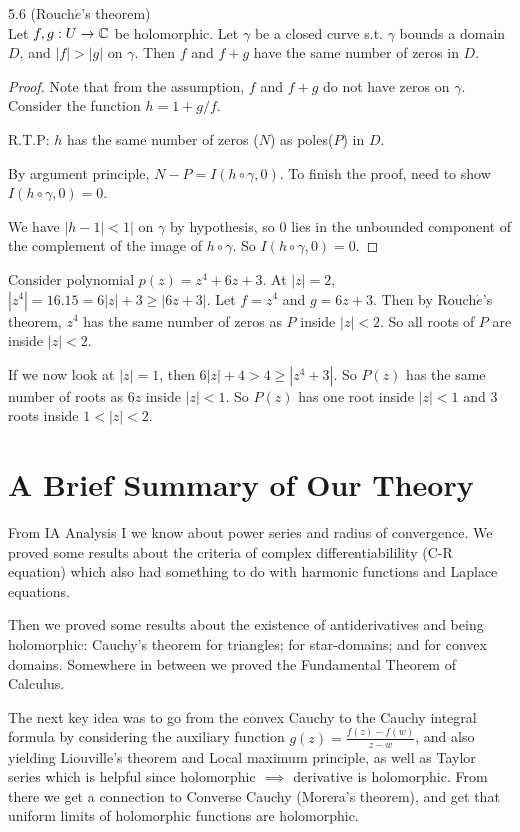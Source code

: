\documentclass[a4paper]{article}
\begin{document}
\begin{thm} 5.6 (Rouch$\acute{e}$'s theorem)\\
Let $f,g : U \to \mathbb{C}$ be holomorphic. Let $\gamma$ be a closed curve s.t. $\gamma$ bounds a domain $D$, and $|f| > |g|$ on $\gamma$. Then $f$ and $f+g$ have the same number of zeros in $D$.
\begin{proof}
Note that from the assumption, $f$ and $f+g$ do not have zeros on $\gamma$. Consider the function $h=1+g/f$.

R.T.P: $h$ has the same number of zeros ($N$) as poles($P$) in $D$.

By argument principle, $N-P = I(h\circ \gamma, 0)$. To finish the proof, need to show $I(h \circ \gamma,0) = 0$.

We have $|h-1|<1|$ on $\gamma$ by hypothesis, so $0$ lies in the unbounded component of the complement of the image of $h \circ \gamma$. So $I(h\circ \gamma,0) = 0$.
\end{proof}
\end{thm}

\begin{eg}
Consider polynomial $p(z) = z^4+6z+3$. At $|z|=2$, $|z^4|=16.15 = 6|z|+3 \geq |6z+3|$. Let $f=z^4$ and $g=6z+3$. Then by Rouch$\acute{e}$'s theorem, $z^4$ has the same number of zeros as $P$ inside $|z|<2$. So all roots of $P$ are inside $|z|<2$.

If we now look at $|z|=1$, then $6|z|+4 > 4 \geq |z^4+3|$. So $P(z)$ has the same number of roots as $6z$ inside $|z|<1$. So $P(z)$ has one root inside $|z|<1$ and 3 roots inside $1<|z|<2$.
\end{eg}

\newpage

\section{A Brief Summary of Our Theory}

From IA Analysis I we know about power series and radius of convergence. We proved some results about the criteria of complex differentiabilility (C-R equation) which also had something to do with harmonic functions and Laplace equations.

Then we proved some results about the existence of antiderivatives and being holomorphic: Cauchy's theorem for triangles; for star-domains; and for convex domains. Somewhere in between we proved the Fundamental Theorem of Calculus.

The next key idea was to go from the convex Cauchy to the Cauchy integral formula by considering the auxiliary function $g(z) = \frac{f(z)-f(w)}{z-w}$, and also yielding Liouville's theorem and Local maximum principle, as well as Taylor series which is helpful since holomorphic $\implies$ derivative is holomorphic. From there we get a connection to Converse Cauchy (Morera's theorem), and get that uniform limits of holomorphic functions are holomorphic.
\end{document}

